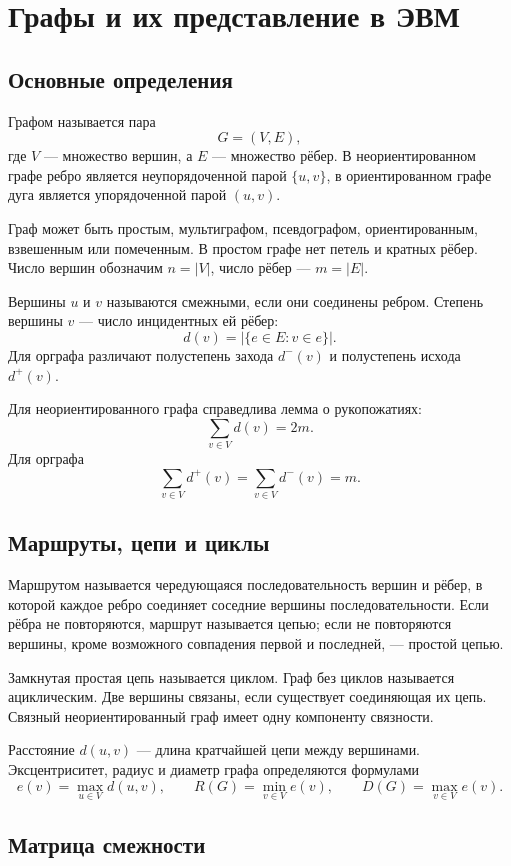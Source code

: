 \section{Графы и их представление в ЭВМ}
\label{sec:graphs-representation}

\subsection{Основные определения}

Графом называется пара
\[
    G=(V,E),
\]
где $V$ --- множество вершин, а $E$ --- множество рёбер. В неориентированном
графе ребро является неупорядоченной парой $\{u,v\}$, в ориентированном графе
дуга является упорядоченной парой $(u,v)$.

Граф может быть простым, мультиграфом, псевдографом, ориентированным,
взвешенным или помеченным. В простом графе нет петель и кратных рёбер.
Число вершин обозначим $n=|V|$, число рёбер --- $m=|E|$.

Вершины $u$ и $v$ называются смежными, если они соединены ребром. Степень
вершины $v$ --- число инцидентных ей рёбер:
\[
    d(v)=|\{e\in E: v\in e\}|.
\]
Для орграфа различают полустепень захода $d^-(v)$ и полустепень исхода
$d^+(v)$.

Для неориентированного графа справедлива лемма о рукопожатиях:
\[
    \sum_{v\in V}d(v)=2m.
\]
Для орграфа
\[
    \sum_{v\in V}d^+(v)=\sum_{v\in V}d^-(v)=m.
\]

\subsection{Маршруты, цепи и циклы}

Маршрутом называется чередующаяся последовательность вершин и рёбер, в которой
каждое ребро соединяет соседние вершины последовательности. Если рёбра не
повторяются, маршрут называется цепью; если не повторяются вершины, кроме
возможного совпадения первой и последней, --- простой цепью.

Замкнутая простая цепь называется циклом. Граф без циклов называется
ациклическим. Две вершины связаны, если существует соединяющая их цепь.
Связный неориентированный граф имеет одну компоненту связности.

Расстояние $d(u,v)$ --- длина кратчайшей цепи между вершинами. Эксцентриситет,
радиус и диаметр графа определяются формулами
\[
 e(v)=\max_{u\in V}d(u,v),\qquad
 R(G)=\min_{v\in V}e(v),\qquad
 D(G)=\max_{v\in V}e(v).
\]

\subsection{Матрица смежности}


